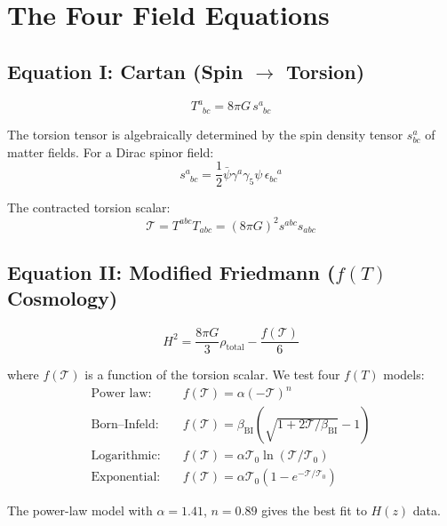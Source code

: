 \documentclass[twocolumn,prd,superscriptaddress,nofootinbib]{revtex4-2}
\begin{document}
\section{The Four Field Equations}

\subsection{Equation I: Cartan (Spin $\to$ Torsion)}

\begin{equation}
\boxed{T^a_{\phantom{a}bc} = 8\pi G\, s^a_{\phantom{a}bc}}
\label{eq:cartan}
\end{equation}

The torsion tensor is algebraically determined by the spin density tensor $s^a_{bc}$ of matter fields. For a Dirac spinor field:
\begin{equation}
s^a_{\phantom{a}bc} = \frac{1}{2}\bar{\psi}\gamma^a\gamma_5\psi\, \epsilon_{bc}^{\phantom{bc}a}
\end{equation}

The contracted torsion scalar:
\begin{equation}
\mathcal{T} = T^{abc}T_{abc} = (8\pi G)^2 s^{abc}s_{abc}
\end{equation}

\subsection{Equation II: Modified Friedmann ($f(T)$ Cosmology)}

\begin{equation}
\boxed{H^2 = \frac{8\pi G}{3}\rho_\text{total} - \frac{f(\mathcal{T})}{6}}
\label{eq:friedmann}
\end{equation}

where $f(\mathcal{T})$ is a function of the torsion scalar. We test four $f(T)$ models:
\begin{align}
\text{Power law:} &\quad f(\mathcal{T}) = \alpha(-\mathcal{T})^n \\
\text{Born--Infeld:} &\quad f(\mathcal{T}) = \beta_\text{BI}\left(\sqrt{1 + 2\mathcal{T}/\beta_\text{BI}} - 1\right) \\
\text{Logarithmic:} &\quad f(\mathcal{T}) = \alpha\mathcal{T}_0\ln(\mathcal{T}/\mathcal{T}_0) \\
\text{Exponential:} &\quad f(\mathcal{T}) = \alpha\mathcal{T}_0(1 - e^{-\mathcal{T}/\mathcal{T}_0})
\end{align}

The power-law model with $\alpha = 1.41$, $n = 0.89$ gives the best fit to $H(z)$ data.
\end{document}
